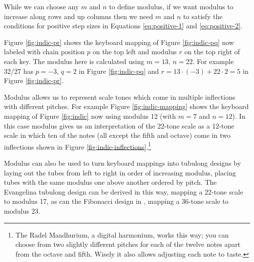 \documentclass[a4paper,11pt]{article}
\begin{document}
While we can choose any $m$ and $n$ to define modulus, if we want modulus to
increase along rows and up columns then we need $m$ and $n$ to satisfy the
conditions for positive step sizes in Equations \ref{eq:positive-1} and
\ref{eq:positive-2}.

Figure \ref{fig:indic-pr} shows the keyboard mapping of Figure
\ref{fig:indic-pq} now labeled with chain position $p$ on the top left and
modulus $r$ on the top right of each key. The modulus here is calculated using
$m = 13$, $n = 22$.  For example 32/27 has $p=-3$, $q=2$ in Figure
\ref{fig:indic-pq} and $r = 13 \cdot (-3) + 22 \cdot 2 = 5$ in Figure
\ref{fig:indic-pr}.

Modulus allows us to represent scale tones which come in multiple inflections
with different pitches. For example Figure \ref{fig:indic-mapping} shows the
keyboard mapping of Figure \ref{fig:indic} now using modulus 12 (with $m = 7$
and $n = 12$). In this case modulus gives us an interpretation of the 22-tone
scale as a 12-tone scale in which ten of the notes (all except the fifth and
octave) come in two inflections \cite{wilson1978kafi, wilson1989tuning} shown
in Figure \ref{fig:indic-inflections}.\footnote{The Radel Maadhurium, a digital
harmonium, works this way; you can choose from two slightly different pitches
for each of the twelve notes apart from the octave and fifth. Wisely it also
allows adjusting each note to taste.}

Modulus can also be used to turn keyboard mappings into tubulong designs by
laying out the tubes from left to right in order of increasing modulus, placing
tubes with the same modulus one above another ordered by pitch. The Evangelina
tubulong design \cite[15-16]{wilsonevangelina} can be derived in this way,
mapping a 22-tone scale to modulus 17, as can the Fibonacci design in
\cite{wilsonfibonacci}, mapping a 36-tone scale to modulus 23.
\end{document}
